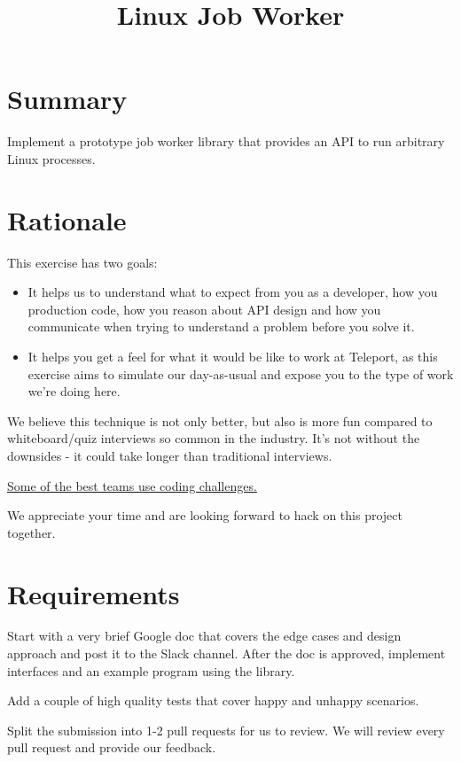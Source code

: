 \documentclass{article}
\begin{document}
 
\title{Linux Job Worker}

\section{Summary}
 
Implement a prototype job worker library that provides an API to run arbitrary Linux processes.

\section{Rationale}
 
    This exercise has two goals:

    \begin{itemize} %
      \item It helps us to understand what to expect from you as a developer, how you production code, how you reason about API design and how you communicate when trying to understand a problem before you solve it.
      \item It helps you get a feel for what it would be like to work at Teleport, as this exercise aims to simulate our day-as-usual and expose you to the type of work we're doing here.
    \end{itemize}

    We believe this technique is not only better, but also is more fun compared to whiteboard/quiz interviews so common in the industry.  It's not without the downsides - it could take longer than traditional interviews.

    \par

    \href{https://sockpuppet.org/blog/2015/03/06/the-hiring-post/}{Some of the best teams use coding challenges.}

    We appreciate your time and are looking forward to hack on this project together.

\section{Requirements} 

  Start with a very brief Google doc that covers the edge cases and design approach and post it to the Slack channel. After the doc is approved, implement interfaces and an example program using the library.

  Add a couple of high quality tests that cover happy and unhappy scenarios.

  Split the submission into 1-2 pull requests for us to review. We will review every pull request and provide our feedback.
\end{document}
